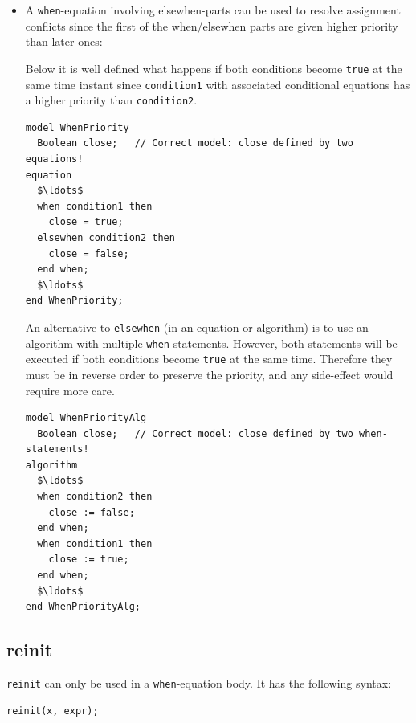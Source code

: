 \begin{itemize}
\item
  A \lstinline!when!-equation involving elsewhen-parts can be used to resolve assignment conflicts since the first of the when/elsewhen parts are given higher priority than later ones:
\begin{nonnormative}
Below it is well defined what happens if both conditions become \lstinline!true! at the same time instant since \lstinline!condition1! with associated conditional equations has a higher priority than \lstinline!condition2!.
\begin{lstlisting}[language=modelica]
model WhenPriority
  Boolean close;   // Correct model: close defined by two equations!
equation
  $\ldots$
  when condition1 then
    close = true;
  elsewhen condition2 then
    close = false;
  end when;
  $\ldots$
end WhenPriority;
\end{lstlisting}
An alternative to \lstinline!elsewhen! (in an equation or algorithm) is to use an algorithm with multiple \lstinline!when!-statements.
However, both statements will be executed if both conditions become \lstinline!true! at the same time.
Therefore they must be in reverse order to preserve the priority, and any side-effect would require more care.
\begin{lstlisting}[language=modelica]
model WhenPriorityAlg
  Boolean close;   // Correct model: close defined by two when-statements!
algorithm
  $\ldots$
  when condition2 then
    close := false;
  end when;
  when condition1 then
    close := true;
  end when;
  $\ldots$
end WhenPriorityAlg;
\end{lstlisting}
\end{nonnormative}
\end{itemize}


\subsection{reinit}\label{reinit}

\lstinline!reinit! can only be used in a \lstinline!when!-equation body.
It has the following syntax:
\begin{lstlisting}[language=modelica]
reinit(x, expr);
\end{lstlisting}

